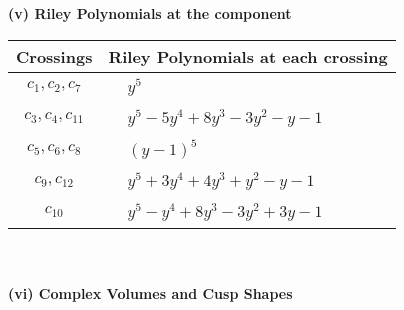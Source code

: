 \documentclass[1p]{elsarticle_modified}
\theoremstyle{definition}
\begin{document}
\newpage\renewcommand{\arraystretch}{1}
\flushleft \textbf{(v) Riley Polynomials at the component}\newline \\
\begin{tabular}{m{50pt}|m{274pt}}
Crossings & \hspace{64pt}Riley Polynomials at each crossing \\
\hline $$\begin{aligned}c_{1},c_{2},c_{7}\end{aligned}$$&$\begin{aligned}
&y^5
\end{aligned}$\\
\hline $$\begin{aligned}c_{3},c_{4},c_{11}\end{aligned}$$&$\begin{aligned}
&y^5-5 y^4+8 y^3-3 y^2- y-1
\end{aligned}$\\
\hline $$\begin{aligned}c_{5},c_{6},c_{8}\end{aligned}$$&$\begin{aligned}
&(y-1)^5
\end{aligned}$\\
\hline $$\begin{aligned}c_{9},c_{12}\end{aligned}$$&$\begin{aligned}
&y^5+3 y^4+4 y^3+y^2- y-1
\end{aligned}$\\
\hline $$\begin{aligned}c_{10}\end{aligned}$$&$\begin{aligned}
&y^5- y^4+8 y^3-3 y^2+3 y-1
\end{aligned}$\\
\hline
\end{tabular}\\~\\
\newpage\flushleft \textbf{(vi) Complex Volumes and Cusp Shapes}
\end{document}
